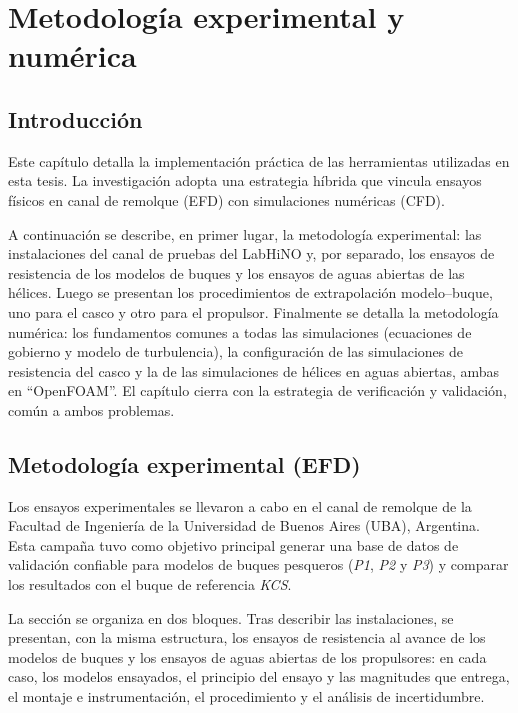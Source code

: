 \chapter{Metodología experimental y numérica}
\label{chap:Metodologia}
\minitoc


\section{Introducción}

Este capítulo detalla la implementación práctica de las herramientas utilizadas en esta tesis. La investigación adopta una estrategia híbrida que vincula ensayos físicos en canal de remolque (EFD) con simulaciones numéricas (CFD).

A continuación se describe, en primer lugar, la metodología experimental: las instalaciones del canal de pruebas del LabHiNO y, por separado, los ensayos de resistencia de los modelos de buques y los ensayos de aguas abiertas de las hélices. Luego se presentan los procedimientos de extrapolación modelo--buque, uno para el casco y otro para el propulsor. Finalmente se detalla la metodología numérica: los fundamentos comunes a todas las simulaciones (ecuaciones de gobierno y modelo de turbulencia), la configuración de las simulaciones de resistencia del casco y la de las simulaciones de hélices en aguas abiertas, ambas en ``OpenFOAM''. El capítulo cierra con la estrategia de verificación y validación, común a ambos problemas.

\section{Metodología experimental (EFD)}

Los ensayos experimentales se llevaron a cabo en el canal de remolque de la Facultad de Ingeniería de la Universidad de Buenos Aires (UBA), Argentina. Esta campaña tuvo como objetivo principal generar una base de datos de validación confiable para modelos de buques pesqueros (\textit{P1}, \textit{P2} y \textit{P3}) y comparar los resultados con el buque de referencia \textit{KCS}.

La sección se organiza en dos bloques. Tras describir las instalaciones, se presentan, con la misma estructura, los ensayos de resistencia al avance de los modelos de buques y los ensayos de aguas abiertas de los propulsores: en cada caso, los modelos ensayados, el principio del ensayo y las magnitudes que entrega, el montaje e instrumentación, el procedimiento y el análisis de incertidumbre.

